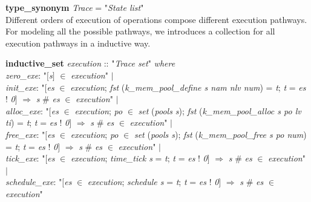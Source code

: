 \documentclass[runningheads]{llncs}
\begin{document}
\phantom{x} \textbf{type\_synonym} \textsl{Trace} = "\textsl{State list}" \\

Different orders of execution of operations compose different execution pathways. For modeling all the possible pathways, we introduces a collection for all execution pathways in a inductive way.

\phantom{x} \textbf{inductive\_set} \textsl{execution} :: "\textsl{Trace set}" \textsl{where} \\
\phantom{x} \hspace{3pt} \textsl{zero\_exe}: "$\lbrack$\textsl{s}$\rbrack$ $\in$ \textsl{execution}" $\mid$ \\
\phantom{x} \hspace{3pt} \textsl{init\_exe}: "$\lbrack$\textsl{es} $\in$ \textsl{execution}; \textsl{fst} (\textsl{k\_mem\_pool\_define s nam nlv num}) = \textsl{t}; \textsl{t} = \textsl{es} ! \textsl{0}$\rbrack$ $\Longrightarrow$ \textsl{s} \# \textsl{es} $\in$ \textsl{execution}" $\mid$ \\
\phantom{x} \hspace{3pt} \textsl{alloc\_exe}: "$\lbrack$\textsl{es} $\in$ \textsl{execution}; \textsl{po} $\in$ \textsl{set} (\textsl{pools s}); \textsl{fst} (\textsl{k\_mem\_pool\_alloc s po lv ti}) = \textsl{t}; \textsl{t} = \textsl{es} ! \textsl{0}$\rbrack$ $\Longrightarrow$ \textsl{s} \# \textsl{es} $\in$ \textsl{execution}" $\mid$ \\
\phantom{x} \hspace{3pt} \textsl{free\_exe}: "$\lbrack$\textsl{es} $\in$ \textsl{execution}; \textsl{po} $\in$ \textsl{set} (\textsl{pools s}); \textsl{fst} (\textsl{k\_mem\_pool\_free s po num}) = \textsl{t}; \textsl{t} = \textsl{es} ! \textsl{0}$\rbrack$ $\Longrightarrow$ \textsl{s} \# \textsl{es} $\in$ \textsl{execution}" $\mid$ \\
\phantom{x} \hspace{3pt} \textsl{tick\_exe}: "$\lbrack$\textsl{es} $\in$ \textsl{execution}; \textsl{time\_tick s} = \textsl{t}; \textsl{t} = \textsl{es} ! \textsl{0}$\rbrack$ $\Longrightarrow$ \textsl{s} \# \textsl{es} $\in$ \textsl{execution}" $\mid$ \\
\phantom{x} \hspace{3pt} \textsl{schedule\_exe}: "$\lbrack$\textsl{es} $\in$ \textsl{execution}; \textsl{schedule s} = \textsl{t}; \textsl{t} = \textsl{es} ! \textsl{0}$\rbrack$ $\Longrightarrow$ \textsl{s} \# \textsl{es} $\in$ \textsl{execution}" \\
\end{document}
